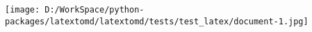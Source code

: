 \documentclass{article}
\begin{document}
		\texttt{[image: D:/WorkSpace/python-packages/latextomd/latextomd/tests/test\_latex/document-1.jpg]}
	
\end{document}
